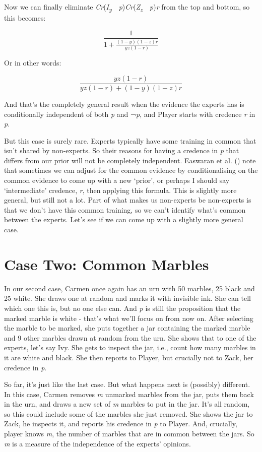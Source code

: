 \documentclass[
  10pt,
  letterpaper,
  DIV=11,
  numbers=noendperiod,
  twoside]{scrartcl}
\begin{document}
Now we can finally eliminate
\emph{Cr}(\emph{I\textsubscript{y}}~\textbar~\emph{p})\emph{Cr}(\emph{Z\textsubscript{z}}~\textbar~\emph{p})\emph{r}
from the top and bottom, so this becomes:

\[
\frac{1}{1 + \frac{(1-y)(1-z)r}{yz(1-r)}}
\]

Or in other words:

\[
\frac{yz(1-r)}{yz(1-r) + (1-y)(1-z)r}
\]

And that's the completely general result when the evidence the experts
has is conditionally independent of both \emph{p} and ¬\emph{p}, and
Player starts with credence \emph{r} in \emph{p}.

But this case is surely rare. Experts typically have some training in
common that isn't shared by non-experts. So their reasons for having a
credence in \emph{p} that differs from our prior will not be completely
independent. Easwaran et al. ()
note that sometimes we can adjust for the common evidence by
conditionalising on the common evidence to come up with a new `prior',
or perhaps I should say `intermediate' credence, \emph{r}, then applying
this formula. This is slightly more general, but still not a lot. Part
of what makes us non-experts be non-experts is that we don't have this
common training, so we can't identify what's common between the experts.
Let's see if we can come up with a slightly more general case.

\section{Case Two: Common Marbles}\label{case-two-common-marbles}

In our second case, Carmen once again has an urn with 50 marbles, 25
black and 25 white. She draws one at random and marks it with invisible
ink. She can tell which one this is, but no one else can. And \emph{p}
is still the proposition that the marked marble is white - that's what
we'll focus on from now on. After selecting the marble to be marked, she
puts together a jar containing the marked marble and 9 other marbles
drawn at random from the urn. She shows that to one of the experts,
let's say Ivy. She gets to inspect the jar, i.e., count how many marbles
in it are white and black. She then reports to Player, but crucially not
to Zack, her credence in \emph{p}.

So far, it's just like the last case. But what happens next is
(possibly) different. In this case, Carmen removes \emph{m} unmarked
marbles from the jar, puts them back in the urn, and draws a new set of
\emph{m} marbles to put in the jar. It's all random, so this could
include some of the marbles she just removed. She shows the jar to Zack,
he inspects it, and reports his credence in \emph{p} to Player. And,
crucially, player knows \emph{m}, the number of marbles that are in
common between the jars. So \emph{m} is a measure of the independence of
the experts' opinions.
\end{document}
